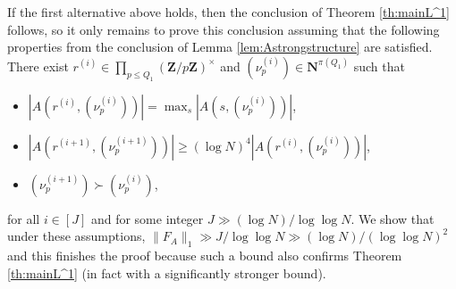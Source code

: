 \documentclass[11pt, reqno]{amsart}
\begin{document}
If the first alternative above holds, then the conclusion of Theorem \ref{th:mainL^1} follows, so it only remains to prove this conclusion assuming that the following properties from the conclusion of Lemma \ref{lem:Astrongstructure} are satisfied. There exist $r^{(i)}\in\prod_{p\leqslant Q_1}(\mathbf{Z}/p\mathbf{Z})^\times$ and $(\nu_p^{(i)})\in\mathbf{N}^{\pi(Q_1)}$ such that 
\begin{itemize}
    \item [(i)] $|A(r^{(i)},(\nu_p^{(i)}))|=\max_s|A(s,(\nu_p^{(i)}))|$,
    \item [(ii)] $|A(r^{(i+1)},(\nu_p^{(i+1)}))|\geqslant (\log N)^4|A(r^{(i)},(\nu_p^{(i)}))|$,
    \item [(iii)] $(\nu_p^{(i+1)})\succ (\nu_p^{(i)})$,
\end{itemize}
for all $i\in[J]$ and for some integer $J\gg (\log N)/\log \log N$. We show that under these assumptions, $\lVert F_A\rVert_1\gg J/\log\log N\gg(\log N)/(\log\log N)^{2}$ and this finishes the proof because such a bound also confirms Theorem \ref{th:mainL^1} (in fact with a significantly stronger bound).

\medskip
\end{document}
